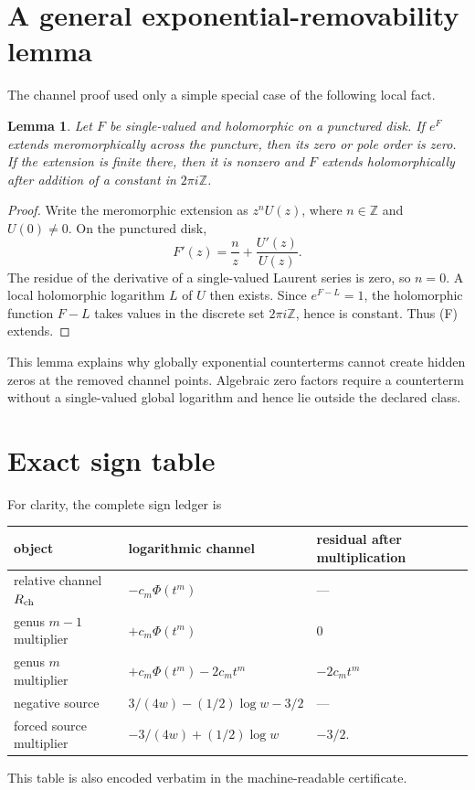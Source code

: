 \documentclass[11pt]{article}
\newtheorem{lemma}[theorem]{Lemma}
\begin{document}
\appendix
\section{A general exponential-removability lemma}

The channel proof used only a simple special case of the following local
fact.

\begin{lemma}\label{lem:general-exp}
Let \(F\) be single-valued and holomorphic on a punctured disk.  If \(e^F\)
extends meromorphically across the puncture, then its zero or pole order is
zero.  If the extension is finite there, then it is nonzero and \(F\) extends
holomorphically after addition of a constant in \(2\pi i\mathbb Z\).
\end{lemma}

\begin{proof}
Write the meromorphic extension as \(z^nU(z)\), where \(n\in\mathbb Z\) and
\(U(0)\ne0\).  On the punctured disk,
\[
 F'(z)=\frac nz+\frac{U'(z)}{U(z)}.
\]
The residue of the derivative of a single-valued Laurent series is zero, so
\(n=0\).  A local holomorphic logarithm \(L\) of \(U\) then exists.  Since
\(e^{F-L}=1\), the holomorphic function \(F-L\) takes values in the discrete
set \(2\pi i\mathbb Z\), hence is constant.  Thus (F) extends.
\end{proof}

This lemma explains why globally exponential counterterms cannot create
hidden zeros at the removed channel points.  Algebraic zero factors require a
counterterm without a single-valued global logarithm and hence lie outside the
declared class.

\section{Exact sign table}

For clarity, the complete sign ledger is
\begin{center}
\begin{tabular}{lll}
object & logarithmic channel & residual after multiplication\\\hline
relative channel $R_{\rm ch}$ & $-c_m\Phi(t^m)$ & ---\\
genus $m-1$ multiplier & $+c_m\Phi(t^m)$ & $0$\\
genus $m$ multiplier & $+c_m\Phi(t^m)-2c_mt^m$
 & $-2c_mt^m$\\
negative source & $3/(4w)-(1/2)\log w-3/2$ & ---\\
forced source multiplier & $-3/(4w)+(1/2)\log w$ & $-3/2$.
\end{tabular}
\end{center}
This table is also encoded verbatim in the machine-readable certificate.



\end{document}

